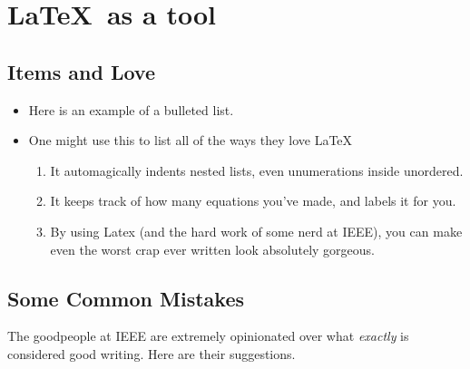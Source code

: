 \documentclass[conference]{IEEEtran}
\begin{document}
\section{\LaTeX\ as a tool}%

\subsection{Items and Love}
\begin{itemize}
        \item Here is an example of a bulleted list.
        \item One might use this to list all of the ways they love \LaTeX
                \begin{enumerate}
                        \item It automagically indents nested lists, even unumerations inside unordered.
                        \item It keeps track of how many equations you've made, and labels it for you.
                        \item By using Latex (and the hard work of some nerd at IEEE), you can make even the worst crap ever written look absolutely gorgeous.
                \end{enumerate}
\end{itemize}

\subsection{Some Common Mistakes}\label{SCM}
The good\footnotemark people at IEEE are extremely opinionated over what \textit{exactly} is considered good writing. Here are their suggestions.

\end{document}
